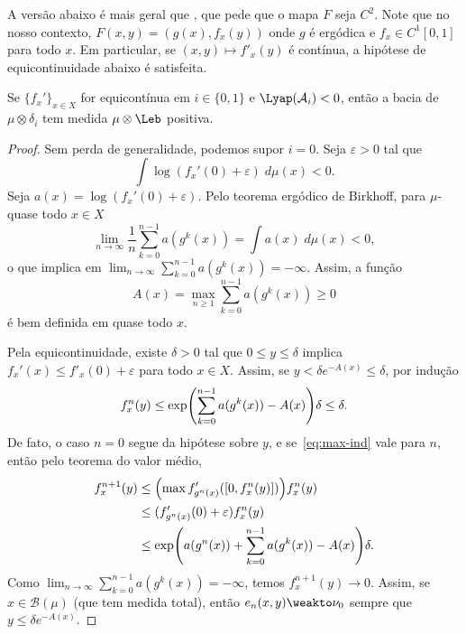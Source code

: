 \documentclass[../fapesp0]{subfiles}
\begin{document}
A versão abaixo é mais geral que \cite[lema A.1]{bonifantSchwarzianDerivativesCylinder2008}, que pede que o mapa \(F\) seja \(C^2\). Note que no nosso contexto, \(F(x,y) = (g(x),f_x(y))\) onde \(g\) é ergódica e \(f_x \in C^1[0,1]\) para todo \(x\). Em particular, se \((x,y) \mapsto f'_x(y)\) é contínua, a hipótese de equicontinuidade abaixo é satisfeita. 
\begin{lemma}
  Se \(\{ f_x' \}_{x \in X}\) for equicontínua em \(i \in \{ 0,1 \}\) e \(\Lyap(\mathcal{A}_i) < 0\), então a bacia de \(\mu \otimes \delta_i\) tem medida \(\mu \otimes \Leb\) positiva. 
\end{lemma}

\begin{proof}
  Sem perda de generalidade, podemos supor \(i = 0\). Seja \(\varepsilon > 0\) tal que
  \begin{equation*}
    \int \log(f_x'(0) + \varepsilon) \;d\mu(x) < 0.
  \end{equation*}
  Seja \(a(x) = \log(f_x'(0) + \varepsilon)\). Pelo teorema ergódico de Birkhoff, para \(\mu\)-quase todo \(x \in X\)
  \begin{equation*}
    \lim_{n \to \infty}\frac{1}{n}\sum_{k = 0}^{n - 1} a(g^k(x)) = 
    \int a(x) \;d\mu(x) < 0,
  \end{equation*}
  o que implica em \(\lim_{n \to \infty}\sum_{k = 0}^{n - 1} a(g^k(x)) = -\infty\). Assim, a função
  \begin{equation*}
    A(x) = \max_{n \geq 1}\sum_{k = 0}^{n - 1} a(g^k(x)) \geq 0
  \end{equation*}
  é bem definida em quase todo \(x\).
  
  Pela equicontinuidade, existe \(\delta > 0\) tal que \(0 \leq y \leq \delta\) implica \(f_x'(x) \leq f'_x(0) + \varepsilon\) para todo \(x \in X\). Assim, se \(y < \delta e^{-A(x)} \leq \delta\), por indução
  \begin{equation}\label{eq:max-ind}
    f_x^n(y) \leq \exp\rpar*{\sum_{k = 0}^{n - 1}a(g^k(x)) - A(x)}\delta \leq \delta.
  \end{equation}
  De fato, o caso \(n = 0\) segue da hipótese sobre \(y\), e se~\eqref{eq:max-ind} vale para \(n\), então pelo teorema do valor médio,
  \begin{align*}
    f_x^{n + 1}(y) &\leq \rpar[\Big]{\max f'_{g^{n}(x)}([0, f^n_x(y)])} f_x^n(y) \\
                   &\leq (f'_{g^{n}(x)}(0) + \varepsilon)f_x^n(y)\\
                   &\leq \exp\rpar*{a(g^{n}(x)) + \sum_{k = 0}^{n - 1}a(g^k(x)) - A(x)}\delta.
  \end{align*}
  Como \(\lim_{n \to \infty} \sum_{k = 0}^{n - 1}a(g^k(x)) = -\infty\), temos \(f_x^{n + 1}(y) \to 0\). Assim, se \(x \in \mathcal{B}(\mu)\) (que tem medida total), então \(e_{n}(x,y) \weakto \nu_0\) sempre que \(y \leq \delta e^{-A(x)}\).
\end{proof}
\end{document}
